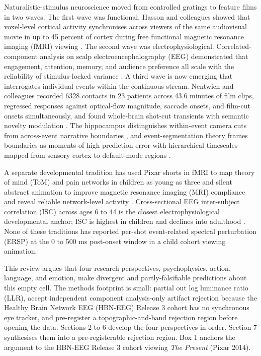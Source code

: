 \documentclass[preprint,12pt]{elsarticle}
\begin{document}
Naturalistic-stimulus neuroscience moved from controlled gratings to feature films in two waves. The first wave was functional. Hasson and colleagues showed that voxel-level cortical activity synchronises across viewers of the same audiovisual movie in up to 45 percent of cortex during free functional magnetic resonance imaging (fMRI) viewing \cite{Hasson2004IntersubjectSO}. The second wave was electrophysiological. Correlated-component analysis on scalp electroencephalography (EEG) demonstrated that engagement, attention, memory, and audience preference all scale with the reliability of stimulus-locked variance \cite{dmochowski2012correlated,Ki2016AttentionSM,Cohen2016MemorableAN,Dmochowski2014AudiencePA,Madsen2022CognitivePO}. A third wave is now emerging that interrogates individual events within the continuous stream. Nentwich and colleagues recorded 6328 contacts in 23 patients across 43.6 minutes of film clips, regressed responses against optical-flow magnitude, saccade onsets, and film-cut onsets simultaneously, and found whole-brain shot-cut transients with semantic novelty modulation \cite{Nentwich2023SemanticNM}. The hippocampus distinguishes within-event camera cuts from across-event narrative boundaries \cite{Ben-Yakov2018TheHF}, and event-segmentation theory frames boundaries as moments of high prediction error with hierarchical timescales mapped from sensory cortex to default-mode regions \cite{zacks2007event,speer2007narrative,baldassano2017event}.

A separate developmental tradition has used Pixar shorts in fMRI to map theory of mind (ToM) and pain networks in children as young as three \cite{Richardson2018DevelopmentOT} and silent abstract animation to improve magnetic resonance imaging (MRI) compliance and reveal reliable network-level activity \cite{Vanderwal2015InscapesAM}. Cross-sectional EEG inter-subject correlation (ISC) across ages 6 to 44 is the closest electrophysiological developmental anchor; ISC is highest in children and declines into adulthood \cite{Petroni2018TheVO}. None of these traditions has reported per-shot event-related spectral perturbation (ERSP) at the 0 to 500 ms post-onset window in a child cohort viewing animation.

This review argues that four research perspectives, psychophysics, action, language, and emotion, make divergent and partly-falsifiable predictions about this empty cell. The methods footprint is small: partial out log luminance ratio (LLR), accept independent component analysis-only artifact rejection because the Healthy Brain Network EEG (HBN-EEG) Release 3 cohort has no synchronous eye tracker, and pre-register a topographic-and-band rejection region before opening the data. Sections 2 to 6 develop the four perspectives in order. Section 7 synthesises them into a pre-registerable rejection region. Box 1 anchors the argument to the HBN-EEG Release 3 cohort viewing \textit{The Present} (Pixar 2014).
\end{document}
